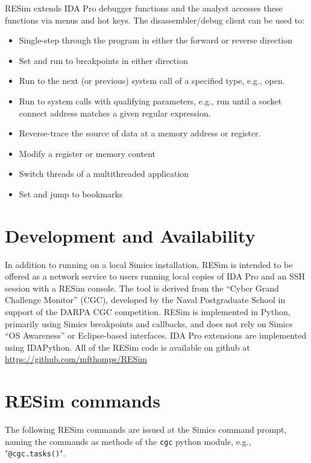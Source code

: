 \documentclass[titlepage]{article}
\begin{document}
RESim extends IDA Pro debugger functions and the analyst accesses these functions via menus and hot keys.   The disassembler/debug client can be used to:
\begin{itemize}
\item Single-step through the program in either the forward or reverse direction
\item Set and run to breakpoints in either direction
\item Run to the next (or previous) system call of a specified type, e.g., open.
\item Run to system calls with qualifying parameters, e.g., run until a socket connect address matches a given regular expression.
\item Reverse-trace the source of data at a memory address or register.
\item Modify a register or memory content
\item Switch threads of a multithreaded application
\item Set and jump to bookmarks
\end{itemize}

\section{Development and Availability}
In addition to running on a local Simics installation, RESim is intended to be offered as a network service to users running local copies of IDA Pro and an SSH session with a RESim console.  The tool is derived from the “Cyber Grand Challenge Monitor” (CGC), developed by the Naval Postgraduate School in support of the DARPA CGC competition.  
RESim is implemented in Python, primarily using Simics breakpoints and callbacks, and does not rely on 
Simics “OS Awareness” or Eclipse-based interfaces.   IDA Pro extensions are implemented using IDAPython.  
All of the RESim code is available on github at \url{https://github.com/mfthomps/RESim}

\section{RESim commands}
The following RESim commands are issued at the Simics command prompt, naming the commands as methods of the {\tt cgc} python module,
e.g., "{\tt @cgc.tasks()}".
\end{document}
